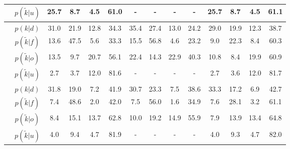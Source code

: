 \begin{center}
\begin{tabular}{c|c|cccc|cccc|cccc}
		&$p(\tilde{k}|u)$ & 25.7 & 8.7 & 4.5 & 61.0 & - & - & - & - & 25.7 & 8.7 & 4.5 & 61.1\\
		\hline
		\parbox[t]{2mm}{}&$p(k|d)$ & \textcolor{mygreen}{31.0} & \textcolor{myred}{21.9} & \textcolor{myred}{12.8} & 34.3 & \textcolor{mygreen}{35.4} & \textcolor{myred}{27.4} & \textcolor{myred}{13.0} & 24.2 & \textcolor{mygreen}{29.0} & \textcolor{myred}{19.9} & \textcolor{myred}{12.3} & 38.7\\
		&$p(\tilde{k}|f)$ & \textcolor{myred}{13.6} & \textcolor{mygreen}{47.5} & \textcolor{myred}{5.6} & 33.3 & \textcolor{myred}{15.5} & \textcolor{mygreen}{56.8} & \textcolor{myred}{4.6} & 23.2 & \textcolor{myred}{9.0} & \textcolor{mygreen}{22.3} & \textcolor{myred}{8.4} & 60.3\\
		&$p(\tilde{k}|o)$ & \textcolor{myred}{13.5} & \textcolor{myred}{9.7} & \textcolor{mygreen}{20.7} & 56.1 & \textcolor{myred}{22.4} & \textcolor{myred}{14.3} & \textcolor{mygreen}{22.9} & 40.3 & \textcolor{myred}{10.8} & \textcolor{myred}{8.4} & \textcolor{mygreen}{19.9} & 60.9\\
		&$p(\tilde{k}|u)$ & 2.7 & 3.7 & 12.0 & 81.6 & - & - & - & - & 2.7 & 3.6 & 12.0 & 81.7\\
		\hline
		\parbox[t]{2mm}{}&$p(k|d)$ & \textcolor{mygreen}{31.8} & \textcolor{myred}{19.0} & \textcolor{myred}{7.2} & 41.9 & \textcolor{mygreen}{30.7} & \textcolor{myred}{23.3} & \textcolor{myred}{7.5} & 38.6 & \textcolor{mygreen}{33.3} & \textcolor{myred}{17.2} & \textcolor{myred}{6.9} & 42.7\\
		&$p(\tilde{k}|f)$ & \textcolor{myred}{7.4} & \textcolor{mygreen}{48.6} & \textcolor{myred}{2.0} & 42.0 & \textcolor{myred}{7.5} & \textcolor{mygreen}{56.0} & \textcolor{myred}{1.6} & 34.9 & \textcolor{myred}{7.6} & \textcolor{mygreen}{28.1} & \textcolor{myred}{3.2} & 61.1\\
		&$p(\tilde{k}|o)$ & \textcolor{myred}{8.4} & \textcolor{myred}{15.1} & \textcolor{mygreen}{13.7} & 62.8 & \textcolor{myred}{10.0} & \textcolor{myred}{19.2} & \textcolor{mygreen}{14.9} & 55.9 & \textcolor{myred}{7.9} & \textcolor{myred}{13.9} & \textcolor{mygreen}{13.4} & 64.8\\
		&$p(\tilde{k}|u)$ & 4.0 & 9.4 & 4.7 & 81.9 & - & - & - & - & 4.0 & 9.3 & 4.7 & 82.0\\

\end{tabular}
\end{center}
